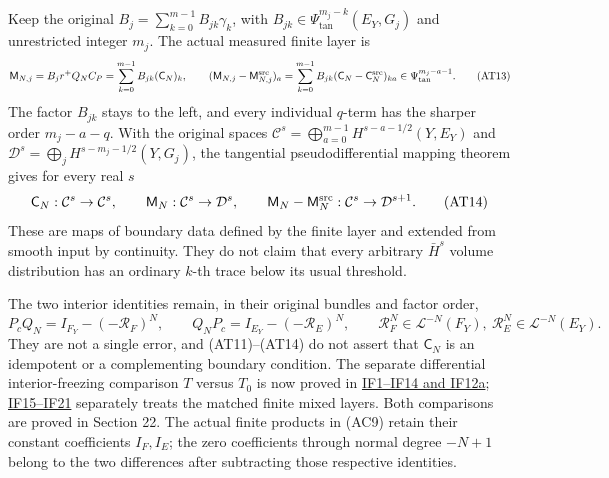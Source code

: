 \documentclass[
  11pt,
]{article}
\begin{document}
Keep the original \(B_j=\sum_{k=0}^{m-1}B_{jk}\gamma_k\), with
\(B_{jk}\in\Psi_{\mathrm{tan}}^{m_j-k}(E_Y,G_j)\) and unrestricted
integer \(m_j\). The actual measured finite layer is \[
 \mathsf M_{N,j}=B_jr^+Q_NC_P
       =\sum_{k=0}^{m-1}B_{jk}(\mathsf C_N)_k ,
 \qquad
 (\mathsf M_{N,j}-\mathsf M_{N,j}^{\rm src})_a
       =\sum_{k=0}^{m-1}B_{jk}
         (\mathsf C_N-\mathsf C_N^{\rm src})_{ka}
       \in\Psi_{\mathrm{tan}}^{m_j-a-1}.
 \tag{AT13}
\] The factor \(B_{jk}\) stays to the left, and every individual
\(q\)-term has the sharper order \(m_j-a-q\). With the original spaces
\(\mathcal C^s=\bigoplus_{a=0}^{m-1}H^{s-a-1/2}(Y,E_Y)\) and
\(\mathcal D^s=\bigoplus_j H^{s-m_j-1/2}(Y,G_j)\), the tangential
pseudodifferential mapping theorem gives for every real \(s\) \[
 \mathsf C_N:\mathcal C^s\to\mathcal C^s,\qquad
 \mathsf M_N:\mathcal C^s\to\mathcal D^s,\qquad
 \mathsf M_N-\mathsf M_N^{\rm src}:\mathcal C^s\to\mathcal D^{s+1}.
 \tag{AT14}
\] These are maps of boundary data defined by the finite layer and
extended from smooth input by continuity. They do not claim that every
arbitrary \(\bar H^s\) volume distribution has an ordinary \(k\)-th
trace below its usual threshold.

The two interior identities remain, in their original bundles and factor
order, \[
 P_cQ_N=I_{F_Y}-(-\mathcal R_F)^N,\qquad
 Q_NP_c=I_{E_Y}-(-\mathcal R_E)^N,
 \qquad
 \mathcal R_F^N\in\mathcal L^{-N}(F_Y),\
 \mathcal R_E^N\in\mathcal L^{-N}(E_Y).
 \tag{AT15}
\] They are not a single error, and (AT11)--(AT14) do not assert that
\(\mathsf C_N\) is an idempotent or a complementing boundary condition.
The separate differential interior-freezing comparison \(T\) versus
\(T_0\) is now proved in \hyperref[boundary-foundation-22]{IF1--IF14 and
IF12a}; \hyperref[boundary-foundation-22]{IF15--IF21} separately treats
the matched finite mixed layers. Both comparisons are proved in Section
22. The actual finite products in (AC9) retain their constant
coefficients \(I_F,I_E\); the zero coefficients through normal degree
\(-N+1\) belong to the two differences after subtracting those
respective identities.
\end{document}
